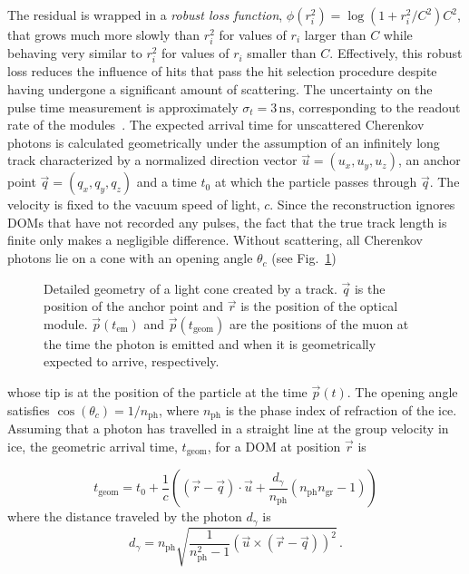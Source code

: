 The residual is wrapped in a \emph{robust loss function}, $\phi(r_{i}^{2})=\log\left(1+r_{i}^{2}/C^2\right)C^2$, that grows much more slowly than $r_{i}^{2}$ for values of $r_i$ larger than $C$ while behaving very similar to $r_i^2$ for values of $r_i$ smaller than $C$. Effectively, this robust loss reduces the influence of hits that pass the hit selection procedure despite having undergone a significant amount of scattering. The uncertainty on the pulse time measurement is approximately $\sigma_{t}=3\,\mathrm{ns}$, corresponding to the readout rate of the modules~\cite{icecube_daq}.
The expected arrival time for unscattered Cherenkov photons is calculated geometrically under the assumption of an infinitely long track characterized by a normalized direction vector $\vec{u}=(u_{x},u_{y},u_{z})$,
an anchor point $\vec{q}=(q_{x},q_{y},q_{z})$ and a time $t_{0}$
at which the particle passes through $\vec{q}$. The
velocity is fixed to the vacuum speed of light, $c$. Since the reconstruction ignores DOMs that have not recorded any pulses, the fact that the true track length is finite only makes a negligible  difference.
Without scattering, all Cherenkov photons lie on a cone with an opening
angle $\theta_{c}$ (see Fig.~\ref{fig:Detailed-track-geometry})
\begin{figure}[h]
\begin{centering}
\par
\end{centering}
\caption{\label{fig:Detailed-track-geometry}Detailed geometry of a light cone
created by a track. $\vec{q}$ is the position of the anchor point
and $\vec{r}$ is the position of the optical module. $\vec{p}(t_{\mathrm{em}})$
and $\vec{p}(t_{\mathrm{geom}})$ are the positions of the muon at
the time the photon is emitted and when it is geometrically expected
to arrive, respectively.}
\end{figure}
whose tip is at the position of the particle at the time $\vec{p}(t)$. The opening angle satisfies $\cos(\theta_c)=1/n_{\mathrm{ph}}$, where $n_{\mathrm{ph}}$ is the phase index of refraction of the ice.
Assuming that a photon has travelled in a straight line at the group velocity in ice, the geometric arrival time, $t_{\mathrm{geom}}$, for a DOM at position $\vec{r}$ is

\begin{equation}
t_{\mathrm{geom}}=t_{0}+\frac{1}{c}\left(\left(\vec{r}-\vec{q}\right)\cdot\vec{u}+\frac{d_{\gamma}}{n_{\mathrm{ph}}}\left(n_{\mathrm{ph}}n_{\mathrm{gr}}-1\right)\right)\label{eq:t_geom-MS-track}
\end{equation}
where the distance traveled by the photon $d_\gamma$ is
\begin{equation}
d_{\gamma}=n_{\mathrm{ph}}\sqrt{\frac{1}{n_{\mathrm{ph}}^{2}-1}\left(\vec{u}\times\left(\vec{r}-\vec{q}\right)\right)^{2}}\,.\label{eq:photon-distance-3d}
\end{equation}

